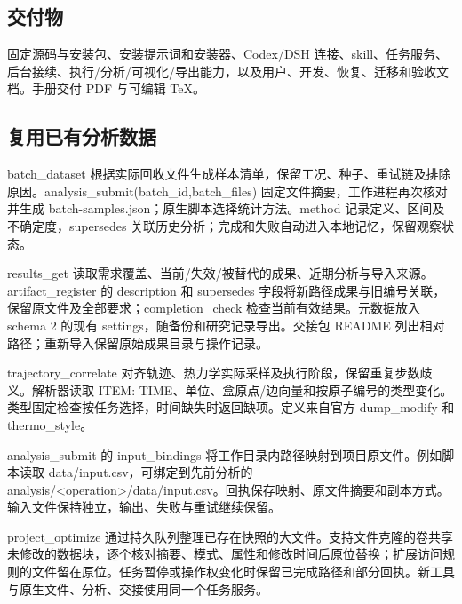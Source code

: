 \documentclass[11pt,a4paper]{ctexart}
\begin{document}
\subsection{交付物}


固定源码与安装包、安装提示词和安装器、Codex/\allowbreak{}DSH 连接、skill、任务服务、后台接续、执行/\allowbreak{}分析/\allowbreak{}可视化/\allowbreak{}导出能力，以及用户、开发、恢复、迁移和验收文档。手册交付 PDF 与可编辑 TeX。



\subsection{复用已有分析数据}


batch\_\allowbreak{}dataset 根据实际回收文件生成样本清单，保留工况、种子、重试链及排除原因。analysis\_\allowbreak{}submit(batch\_\allowbreak{}id,batch\_\allowbreak{}files) 固定文件摘要，工作进程再次核对并生成 batch-samples.json；原生脚本选择统计方法。method 记录定义、区间及不确定度，supersedes 关联历史分析；完成和失败自动进入本地记忆，保留观察状态。



results\_\allowbreak{}get 读取需求覆盖、当前/\allowbreak{}失效/\allowbreak{}被替代的成果、近期分析与导入来源。artifact\_\allowbreak{}register 的 description 和 supersedes 字段将新路径成果与旧编号关联，保留原文件及全部要求；completion\_\allowbreak{}check 检查当前有效结果。元数据放入 schema 2 的现有 settings，随备份和研究记录导出。交接包 README 列出相对路径；重新导入保留原始成果目录与操作记录。



trajectory\_\allowbreak{}correlate 对齐轨迹、热力学实际采样及执行阶段，保留重复步数歧义。解析器读取 ITEM: TIME、单位、盒原点/\allowbreak{}边向量和按原子编号的类型变化。类型固定检查按任务选择，时间缺失时返回缺项。定义来自官方 dump\_\allowbreak{}modify 和 thermo\_\allowbreak{}style。



analysis\_\allowbreak{}submit 的 input\_\allowbreak{}bindings 将工作目录内路径映射到项目原文件。例如脚本读取 data/\allowbreak{}input.csv，可绑定到先前分析的 analysis/\allowbreak{}<operation>/\allowbreak{}data/\allowbreak{}input.csv。回执保存映射、原文件摘要和副本方式。输入文件保持独立，输出、失败与重试继续保留。



project\_\allowbreak{}optimize 通过持久队列整理已存在快照的大文件。支持文件克隆的卷共享未修改的数据块，逐个核对摘要、模式、属性和修改时间后原位替换；扩展访问规则的文件留在原位。任务暂停或操作权变化时保留已完成路径和部分回执。新工具与原生文件、分析、交接使用同一个任务服务。
\end{document}
